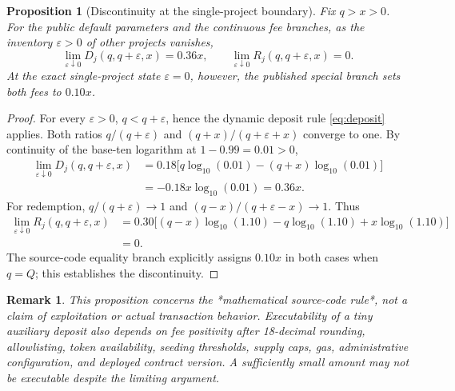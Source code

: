 \documentclass[11pt]{article}
\newtheorem{proposition}{Proposition}
\newtheorem{remark}{Remark}
\begin{document}
\begin{proposition}[Discontinuity at the single-project boundary]
\label{prop:boundary}
Fix $q>x>0$. For the public default parameters and the continuous fee branches, as the inventory $\varepsilon>0$ of other projects vanishes,
\begin{equation}
\lim_{\varepsilon\downarrow0}D_j(q,q+\varepsilon,x)=0.36x,
\qquad
\lim_{\varepsilon\downarrow0}R_j(q,q+\varepsilon,x)=0.
\end{equation}
At the exact single-project state $\varepsilon=0$, however, the published special branch sets both fees to $0.10x$.
\end{proposition}
\begin{proof}
For every $\varepsilon>0$, $q<q+\varepsilon$, hence the dynamic deposit rule \eqref{eq:deposit} applies. Both ratios $q/(q+\varepsilon)$ and $(q+x)/(q+\varepsilon+x)$ converge to one. By continuity of the base-ten logarithm at $1-0.99=0.01>0$,
\[
\begin{aligned}
\lim_{\varepsilon\downarrow0}D_j(q,q+\varepsilon,x)
&=0.18\big[q\log_{10}(0.01)-(q+x)\log_{10}(0.01)\big]\\
&=-0.18x\log_{10}(0.01)=0.36x.
\end{aligned}
\]
For redemption, $q/(q+\varepsilon)\to1$ and $(q-x)/(q+\varepsilon-x)\to1$. Thus
\[
\begin{aligned}
\lim_{\varepsilon\downarrow0}R_j(q,q+\varepsilon,x)
&=0.30\big[(q-x)\log_{10}(1.10)-q\log_{10}(1.10)+x\log_{10}(1.10)\big]\\
&=0.
\end{aligned}
\]
The source-code equality branch explicitly assigns $0.10x$ in both cases when $q=Q$; this establishes the discontinuity.
\end{proof}

\begin{remark}
This proposition concerns the *mathematical source-code rule*, not a claim of exploitation or actual transaction behavior. Executability of a tiny auxiliary deposit also depends on fee positivity after 18-decimal rounding, allowlisting, token availability, seeding thresholds, supply caps, gas, administrative configuration, and deployed contract version. A sufficiently small amount may not be executable despite the limiting argument.
\end{remark}
\end{document}
